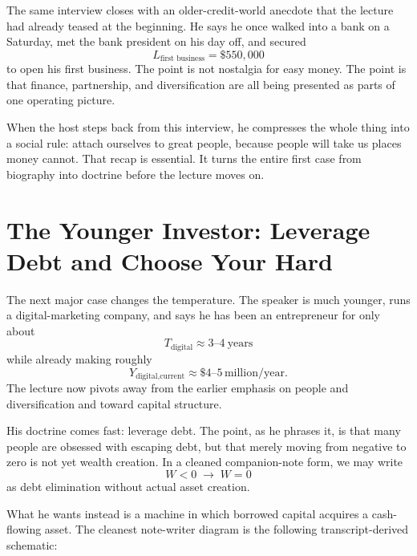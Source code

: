 The same interview closes with an older-credit-world anecdote that the lecture had already teased at the beginning. He says he once walked into a bank on a Saturday, met the bank president on his day off, and secured
\begin{equation}
L_{\text{first business}} = \$550{,}000
\end{equation}
to open his first business. The point is not nostalgia for easy money. The point is that finance, partnership, and diversification are all being presented as parts of one operating picture.

When the host steps back from this interview, he compresses the whole thing into a social rule: attach ourselves to great people, because people will take us places money cannot. That recap is essential. It turns the entire first case from biography into doctrine before the lecture moves on.

\section{The Younger Investor: Leverage Debt and Choose Your Hard}

The next major case changes the temperature. The speaker is much younger, runs a digital-marketing company, and says he has been an entrepreneur for only about
\begin{equation}
T_{\text{digital}} \approx 3\text{--}4\ \text{years}
\end{equation}
while already making roughly
\begin{equation}
Y_{\text{digital,current}} \approx \$4\text{--}5\,\text{million/year}.
\end{equation}
The lecture now pivots away from the earlier emphasis on people and diversification and toward capital structure.

His doctrine comes fast: leverage debt. The point, as he phrases it, is that many people are obsessed with escaping debt, but that merely moving from negative to zero is not yet wealth creation. In a cleaned companion-note form, we may write
\begin{equation}
W<0 \;\to\; W=0
\end{equation}
as debt elimination without actual asset creation.

What he wants instead is a machine in which borrowed capital acquires a cash-flowing asset. The cleanest note-writer diagram is the following transcript-derived schematic:

